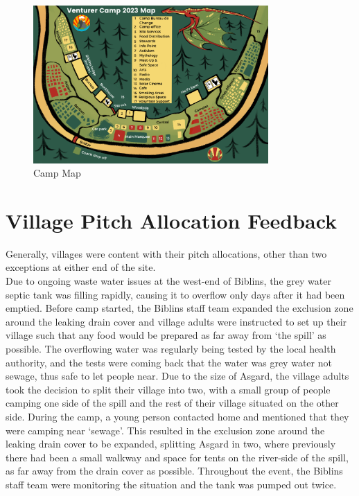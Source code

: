 \begin{figure}[ht]
    \centering
    \includegraphics[width=0.8\textwidth]{assets/camp-map.png}
    \caption{Camp Map}
\end{figure}

\section{Village Pitch Allocation Feedback}
Generally, villages were content with their pitch allocations, other than two exceptions at either end of the site.\\

Due to ongoing waste water issues at the west-end of Biblins, the grey water septic tank was filling rapidly, causing it to overflow only days after it had been emptied. Before camp started, the Biblins staff team expanded the exclusion zone around the leaking drain cover and village adults were instructed to set up their village such that any food would be prepared as far away from `the spill' as possible. The overflowing water was regularly being tested by the local health authority, and the tests were coming back that the water was grey water not sewage, thus safe to let people near.
Due to the size of Asgard, the village adults took the decision to split their village into two, with a small group of people camping one side of the spill and the rest of their village situated on the other side. During the camp, a young person contacted home and mentioned that they were camping near `sewage'. This resulted in the exclusion zone around the leaking drain cover to be expanded, splitting Asgard in two, where previously there had been a small walkway and space for tents on the river-side of the spill, as far away from the drain cover as possible. Throughout the event, the Biblins staff team were monitoring the situation and the tank was pumped out twice. \\

